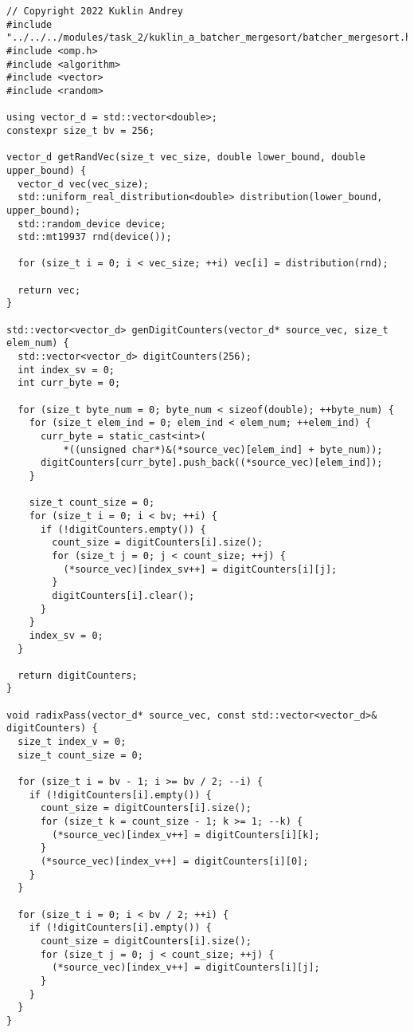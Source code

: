 \documentclass{report}
\begin{document}
\begin{lstlisting}
// Copyright 2022 Kuklin Andrey
#include "../../../modules/task_2/kuklin_a_batcher_mergesort/batcher_mergesort.h"
#include <omp.h>
#include <algorithm>
#include <vector>
#include <random>

using vector_d = std::vector<double>;
constexpr size_t bv = 256;

vector_d getRandVec(size_t vec_size, double lower_bound, double upper_bound) {
  vector_d vec(vec_size);
  std::uniform_real_distribution<double> distribution(lower_bound, upper_bound);
  std::random_device device;
  std::mt19937 rnd(device());

  for (size_t i = 0; i < vec_size; ++i) vec[i] = distribution(rnd);

  return vec;
}

std::vector<vector_d> genDigitCounters(vector_d* source_vec, size_t elem_num) {
  std::vector<vector_d> digitCounters(256);
  int index_sv = 0;
  int curr_byte = 0;

  for (size_t byte_num = 0; byte_num < sizeof(double); ++byte_num) {
    for (size_t elem_ind = 0; elem_ind < elem_num; ++elem_ind) {
      curr_byte = static_cast<int>(
          *((unsigned char*)&(*source_vec)[elem_ind] + byte_num));
      digitCounters[curr_byte].push_back((*source_vec)[elem_ind]);
    }

    size_t count_size = 0;
    for (size_t i = 0; i < bv; ++i) {
      if (!digitCounters.empty()) {
        count_size = digitCounters[i].size();
        for (size_t j = 0; j < count_size; ++j) {
          (*source_vec)[index_sv++] = digitCounters[i][j];
        }
        digitCounters[i].clear();
      }
    }
    index_sv = 0;
  }

  return digitCounters;
}

void radixPass(vector_d* source_vec, const std::vector<vector_d>& digitCounters) {
  size_t index_v = 0;
  size_t count_size = 0;

  for (size_t i = bv - 1; i >= bv / 2; --i) {
    if (!digitCounters[i].empty()) {
      count_size = digitCounters[i].size();
      for (size_t k = count_size - 1; k >= 1; --k) {
        (*source_vec)[index_v++] = digitCounters[i][k];
      }
      (*source_vec)[index_v++] = digitCounters[i][0];
    }
  }

  for (size_t i = 0; i < bv / 2; ++i) {
    if (!digitCounters[i].empty()) {
      count_size = digitCounters[i].size();
      for (size_t j = 0; j < count_size; ++j) {
        (*source_vec)[index_v++] = digitCounters[i][j];
      }
    }
  }
}


\end{lstlisting}
\end{document}
